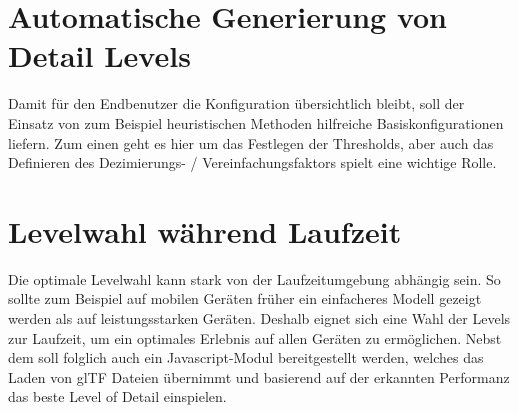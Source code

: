 \section{Automatische Generierung von Detail Levels}
Damit für den Endbenutzer die Konfiguration übersichtlich bleibt, soll der Einsatz von zum Beispiel heuristischen Methoden hilfreiche Basiskonfigurationen liefern.
Zum einen geht es hier um das Festlegen der Thresholds, aber auch das Definieren des Dezimierungs- / Vereinfachungsfaktors spielt eine wichtige Rolle.

\section{Levelwahl während Laufzeit}
Die optimale Levelwahl kann stark von der Laufzeitumgebung abhängig sein. So sollte zum Beispiel auf mobilen Geräten früher ein einfacheres Modell gezeigt werden als auf leistungsstarken Geräten.
Deshalb eignet sich eine Wahl der Levels zur Laufzeit, um ein optimales Erlebnis auf allen Geräten zu ermöglichen.
Nebst dem  soll folglich auch ein Javascript-Modul bereitgestellt werden, welches das Laden von glTF Dateien übernimmt und basierend auf der erkannten Performanz das beste Level of Detail einspielen.

